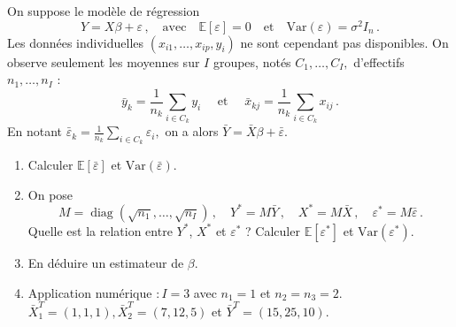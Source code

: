 \documentclass{../td_um}
\providecommand{\1}{\mathds{1}}
\begin{document}
	 On suppose le modèle de régression
	\[
	Y = X \beta + \varepsilon\,,
	\quad \text{avec} \quad
	\mathbb{E}[\varepsilon]=0
	\quad \text{et} \quad \text{Var}(\varepsilon)=\sigma^{2} I_{n}\,.
	\]
	Les données individuelles $\left(x_{i 1}, \ldots, x_{i p}, y_{i}\right)$ ne sont cependant pas disponibles. On observe seulement les moyennes sur $I$ groupes, notés $C_{1}, \ldots, C_{I},$ d'effectifs $n_{1}, \ldots, n_{I}$ :
	\[
	\bar{y}_{k}=\frac{1}{n_{k}} \sum_{i \in C_{k}} y_{i}
	\quad \text { et } \quad
	\bar{x}_{k j}=\frac{1}{n_{k}} \sum_{i \in C_{k}} x_{i j}\,.
	\]
	En notant $\bar{\varepsilon}_{k}=\frac{1}{n_{k}} \sum_{i \in C_{k}} \varepsilon_{i},$ on a alors $\bar{Y}=\bar{X} \beta+\bar{\varepsilon}$.
	\begin{enumerate}
		\item Calculer $\mathbb{E}[\bar{\varepsilon}]$ et $\text{Var}(\bar{\varepsilon})$.
		\item On pose
		\[
		M = \operatorname{diag}(\sqrt{n_{1}}, \ldots, \sqrt{n_{I}})\,,
		\quad
		Y^{*} = M \bar{Y}\,,
		\quad
		X^{*} = M \bar{X}\,,
		\quad
		\varepsilon^{*}=M \bar{\varepsilon}\,.
		\]
		Quelle est la relation entre $Y^{*}$, $X^{*}$ et $\varepsilon^{*}$ ? Calculer $\mathbb{E}[\varepsilon^{*}]$ et $\text{Var}(\varepsilon^{*})$.
		\item En déduire un estimateur de $\beta$.
		\item Application numérique $: I=3$ avec $n_{1}=1$ et $n_{2}=n_{3}=2$. $\bar{X}_{1}^T=(1,1,1), \bar{X}_{2}^T=(7,12,5)$ et $\bar{Y}^T=(15,25,10)$.
	\end{enumerate}
\end{document}
